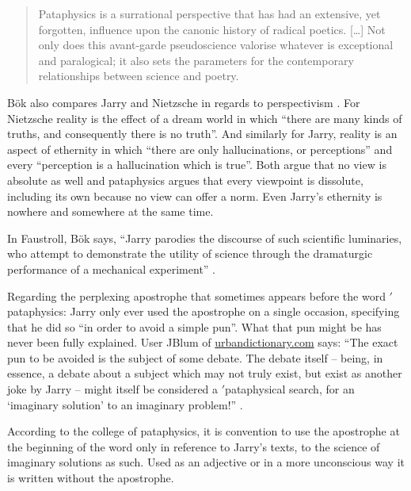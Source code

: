 \begin{quotation}
  Pataphysics is a surrational perspective that has had an extensive, yet forgotten, influence upon the canonic history of radical poetics. […] Not only does this avant-garde pseudoscience valorise whatever is exceptional and paralogical; it also sets the parameters for the contemporary relationships between science and poetry. 
\end{quotation}

Bök also compares Jarry and Nietzsche in regards to perspectivism \autocite*{Bok2002}. For Nietzsche reality is the effect of a dream world in which ``there are many kinds of truths, and consequently there is no truth''. And similarly for Jarry, reality is an aspect of ethernity in which ``there are only hallucinations, or perceptions'' and every ``perception is a hallucination which is true''. Both argue that no view is absolute as well and pataphysics argues that every viewpoint is dissolute, including its own because no view can offer a norm. Even Jarry's ethernity is nowhere and somewhere at the same time.

In Faustroll, Bök says, ``Jarry parodies the discourse of such scientific luminaries, who attempt to demonstrate the utility of science through the dramaturgic performance of a mechanical experiment'' \autocite*{Bok2002}.

\spirals

Regarding the perplexing apostrophe that sometimes appears before the word $'$pataphysics: Jarry only ever used the apostrophe on a single occasion, specifying that he did so ``in order to avoid a simple pun''. What that pun might be has never been fully explained. User JBlum of \url{urbandictionary.com} says: ``The exact pun to be avoided is the subject of some debate. The debate itself -- being, in essence, a debate about a subject which may not truly exist, but exist as another joke by Jarry -- might itself be considered a $'$pataphysical search, for an `imaginary solution' to an imaginary problem!'' \autocite*{pataphysics2007}.

According to the college of pataphysics, it is convention to use the apostrophe at the beginning of the word only in reference to Jarry's texts, to the science of imaginary solutions as such. Used as an adjective or in a more unconscious way it is written without the apostrophe.



